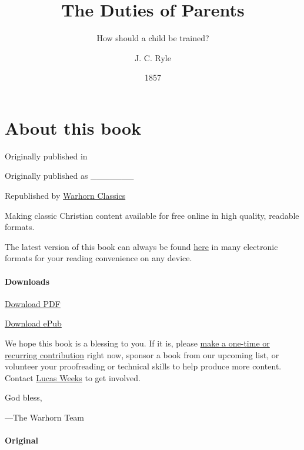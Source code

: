 \documentclass[
]{book}
\title{The Duties of Parents}
\subtitle{How should a child be trained?}
\author{J. C. Ryle}
\date{1857}
\begin{document}
\maketitle

\mainmatter
{}

{
\setcounter{tocdepth}{1}
\tableofcontents
}
\hypertarget{about-this-book}{%
\chapter*{About this book}\label{about-this-book}}

Originally published in

Originally published as \_\_\_\_\_\_\_

Republished by \href{https://classics.warhornmedia.com/}{Warhorn Classics}

Making classic Christian content available for free online in high quality, readable formats.

The latest version of this book can always be found \href{https://warhornmedia.github.io/ryle-duties-of-parents/}{here} in many electronic formats for your reading convenience on any device.

\hypertarget{downloads}{%
\subsubsection*{Downloads}\label{downloads}}

\href{https://warhornmedia.github.io/ryle-duties-of-parents//Ryle-Duties_of_Parents.pdf}{Download PDF}

\href{https://warhornmedia.github.io/ryle-duties-of-parents//Ryle-Duties_of_Parents.epub}{Download ePub}

We hope this book is a blessing to you. If it is, please \href{https://warhornmedia.com/give}{make a one-time or recurring contribution} right now, sponsor a book from our upcoming list, or volunteer your proofreading or technical skills to help produce more content. Contact \href{mailto:lucas@beggarsborn.com}{Lucas Weeks} to get involved.

God bless,

---The Warhorn Team

\hypertarget{original}{%
\subsubsection*{Original}\label{original}}
\end{document}
